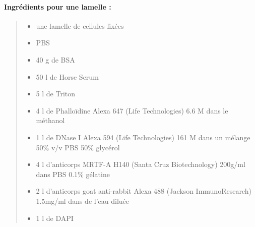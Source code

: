  \paragraph{Ingrédients pour une lamelle : }
 \begin{quote}
 
 
 \begin{itemize}
 \item une lamelle de cellules fixées
 \item PBS
 \item 40 \micro g de BSA
 \item 50 \micro l de Horse Serum
 \item 5 \micro l de Triton
 \item 4 \micro l de Phalloïdine Alexa 647 (Life Technologies) 6.6 \micro M dans le méthanol
 \item 1 \micro l de DNase I Alexa 594 (Life Technologies) 161 \micro M dans un mélange 50\% v/v PBS 50\% glycérol
 \item 4 \micro l d'anticorps MRTF-A H140 (Santa Cruz Biotechnology) 200\micro g/ml dans PBS 0.1\% gélatine
 \item 2 \micro l d'anticorps goat anti-rabbit Alexa 488 (Jackson ImmunoResearch) 1.5mg/ml dans de l'eau diluée
 \item 1 \micro l de DAPI
 \end{itemize}
\end{quote}
\pagebreak
